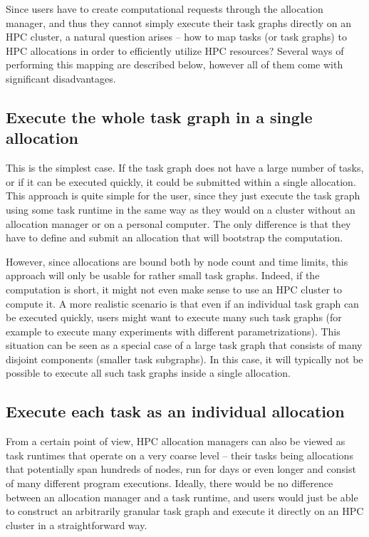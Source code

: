 Since users have to create computational requests through the allocation manager, and thus they
cannot simply execute their task graphs directly on an HPC cluster, a natural question arises --
how to map tasks (or task graphs) to HPC allocations in order to efficiently utilize HPC resources?
Several ways of performing this mapping are described below, however all of them come with
significant disadvantages.

\subsection*{Execute the whole task graph in a single allocation} This is the simplest case. If the
task graph does not have a large number of tasks, or if it can be executed quickly, it could be
submitted within a single allocation. This approach is quite simple for the user, since they just
execute the task graph using some task runtime in the same way as they would on a cluster without
an allocation manager or on a personal computer. The only difference is that they have to define
and submit an allocation that will bootstrap the computation.

However, since allocations are bound both by node count and time limits, this approach will only be
usable for rather small task graphs. Indeed, if the computation is short, it might not even make
sense to use an HPC cluster to compute it. A more realistic scenario is that even if an individual
task graph can be executed quickly, users might want to execute many such task graphs (for example
to execute many experiments with different parametrizations). This situation can be seen as a
special case of a large task graph that consists of many disjoint components (smaller task
subgraphs). In this case, it will typically not be possible to execute all such task graphs inside
a single allocation.

\subsection*{Execute each task as an individual allocation} From a certain point of view, HPC
allocation managers can also be viewed as task runtimes that operate on a very coarse level --
their tasks being allocations that potentially span hundreds of nodes, run for days or even longer
and consist of many different program executions. Ideally, there would be no difference between an
allocation manager and a task runtime, and users would just be able to construct an arbitrarily
granular task graph and execute it directly on an HPC cluster in a straightforward way.

